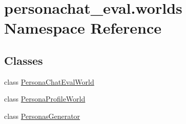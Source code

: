 \hypertarget{namespacepersonachat__eval_1_1worlds}{}\section{personachat\+\_\+eval.\+worlds Namespace Reference}
\label{namespacepersonachat__eval_1_1worlds}
\subsection*{Classes}
\begin{DoxyCompactItemize}
\item 
class \hyperlink{classpersonachat__eval_1_1worlds_1_1PersonaChatEvalWorld}{Persona\+Chat\+Eval\+World}
\item 
class \hyperlink{classpersonachat__eval_1_1worlds_1_1PersonaProfileWorld}{Persona\+Profile\+World}
\item 
class \hyperlink{classpersonachat__eval_1_1worlds_1_1PersonasGenerator}{Personas\+Generator}
\end{DoxyCompactItemize}
